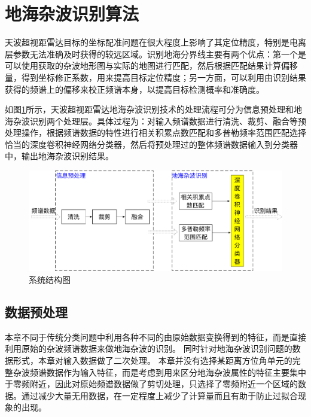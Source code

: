 \section{地海杂波识别算法}
\label{sec:othr_cnn}
天波超视距雷达目标的坐标配准问题在很大程度上影响了其定位精度，特别是电离层参数无法准确及时获得的较远区域。识别地海分界线主要有两个优点：第一个是可以使用获取的杂波地形图与实际的地图进行匹配，然后根据匹配结果计算偏移量，得到坐标修正系数，用来提高目标定位精度；另一方面，可以利用由识别结果获得的频谱上的偏移来校正频谱本身，以提高目标检测概率和准确度。

如图\ref{fig:system}所示，天波超视距雷达地海杂波识别技术的处理流程可分为信息预处理和地海杂波识别两个处理层。具体过程为：对输入频谱数据进行清洗、裁剪、融合等预处理操作，根据频谱数据的特性进行相关积累点数匹配和多普勒频率范围匹配选择恰当的深度卷积神经网络分类器，然后将预处理过的整体频谱数据输入到分类器中，输出地海杂波识别结果。
\begin{figure}[hbt]
	\centering
	\includegraphics[width=\textwidth]{figures/othr/system}
	\caption{系统结构图}
	\label{fig:system}
\end{figure}

\subsection{数据预处理}

本章不同于传统分类问题中利用各种不同的由原始数据变换得到的特征，而是直接利用原始的杂波频谱数据来做地海杂波的识别。
同时针对地海杂波识别问题的数据形式，本章对输入数据做了二次处理。
本章并没有选择某距离方位角单元的完整杂波频谱数据作为输入特征，而是考虑到用来区分地海杂波属性的特征主要集中于零频附近，因此对原始频谱数据做了剪切处理，只选择了零频附近一个区域的数据。通过减少大量无用数据，在一定程度上减少了计算量而且有助于防止过拟合现象的出现。

